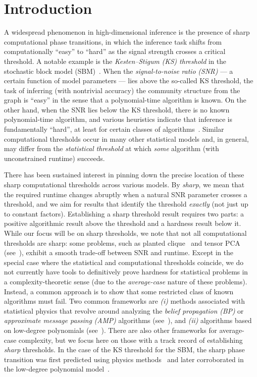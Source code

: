\documentclass[11pt, letterpaper]{article}
\numberwithin{equation}{section}
\begin{document}
\section{Introduction}
A widespread phenomenon in high-dimensional inference is the presence of sharp computational phase transitions, in which the inference task shifts from computationally ``easy'' to ``hard'' as the signal strength crosses a critical threshold. A notable example is the \emph{Kesten--Stigum (KS) threshold} in the stochastic block model (SBM)~\cite{decelle-2,AS-general}. When the \emph{signal-to-noise ratio (SNR)} --- a certain function of model parameters --- lies above the so-called KS threshold, the task of inferring (with nontrivial accuracy) the community structure from the graph is ``easy'' in the sense that a polynomial-time algorithm is known. On the other hand, when the SNR lies below the KS threshold, there is no known polynomial-time algorithm, and various heuristics indicate that inference is fundamentally ``hard'', at least for certain classes of algorithms~\cite{decelle-2,HS-bayesian,spectral-planting,sohn2025sharp,DHSS-recovery}. Similar computational thresholds occur in many other statistical models and, in general, may differ from the \emph{statistical threshold} at which \emph{some} algorithm (with unconstrained runtime) succeeds.

There has been sustained interest in pinning down the precise location of these sharp computational thresholds across various models. By \emph{sharp}, we mean that the required runtime changes abruptly when a natural SNR parameter crosses a threshold, and we aim for results that identify the threshold \emph{exactly} (not just up to constant factors). Establishing a sharp threshold result requires two parts: a positive algorithmic result above the threshold and a hardness result below it. While our focus will be on sharp thresholds, we note that not all computational thresholds are sharp: some problems, such as planted clique~\cite{alon-clique} and tensor PCA (see~\cite{smooth-tensor}), exhibit a smooth trade-off between SNR and runtime.  Except in the special case where the statistical and computational thresholds coincide, we do not currently have tools to definitively prove hardness for statistical problems in a complexity-theoretic sense (due to the \emph{average-case} nature of these problems). Instead, a common approach is to show that some restricted class of known algorithms must fail. Two common frameworks are \emph{(i)} methods associated with statistical physics that revolve around analyzing the \emph{belief propagation (BP)} or \emph{approximate message passing (AMP)} algorithms (see~\cite{phys-survey}), and \emph{(ii)} algorithms based on low-degree polynomials (see~\cite{LD-notes,wein2025computational}). There are also other frameworks for average-case complexity, but we focus here on those with a track record of establishing \emph{sharp} thresholds. In the case of the KS threshold for the SBM, the sharp phase transition was first predicted using physics methods~\cite{decelle-1,decelle-2} and later corroborated in the low-degree polynomial model~\cite{HS-bayesian,spectral-planting,sohn2025sharp,DHSS-recovery}.
\end{document}
